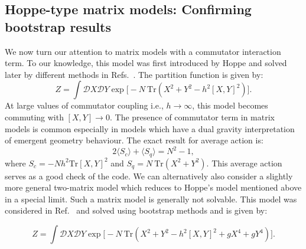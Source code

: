 \documentclass[letter,11pt]{article}
\begin{document}
\subsection{\label{subsec:Hoppe}Hoppe-type matrix models: Confirming bootstrap results}
We now turn our attention to matrix models with a commutator interaction term. 
To our knowledge, this model 
was first introduced by Hoppe \cite{Hoppe:1982en} and solved later by different methods in 
Refs.~\cite{Kazakov:1998ji,Berenstein:2008eg}.
The partition function is given by:
\begin{equation}
Z = \int \mathcal{D}X \mathcal{D}Y \exp \Big[-N ~ \mbox{Tr} (X^2 + Y^2 - h^2 [X,Y]^2) \Big]. 
\end{equation}
At large values of commutator coupling i.e., $ h \to \infty$, this model becomes commuting with 
$ [X,Y] \to 0$. The presence of commutator term in matrix models is common especially in 
models which have a dual gravity interpretation of emergent geometry behaviour. 
The exact result for average action is:
\begin{equation}
	2 \langle S_{c} \rangle + \langle S_{q}  \rangle = N^2 - 1, 
\end{equation}
where $ S_{c} = -Nh^2 \mbox{Tr}[X,Y]^2$  and 
$ S_{q} = N~\mbox{Tr} (X^2 + Y^2)$.
This average action serves as a good check of the code. We can alternatively also consider a slightly more general two-matrix model which reduces to Hoppe's model mentioned above in a special limit. 
Such a matrix model is generally not solvable. This model was considered in Ref.~\cite{Kazakov:2021lel} and 
solved using bootstrap methods and is given by:

\begin{equation}
\label{eq:GHM1} 
Z = \int \mathcal{D}X \mathcal{D}Y \exp \Big[-N ~ \mbox{Tr} (X^2 + Y^2 - h^2 [X,Y]^2 + gX^4 + gY^4) \Big].	
\end{equation}
\end{document}
